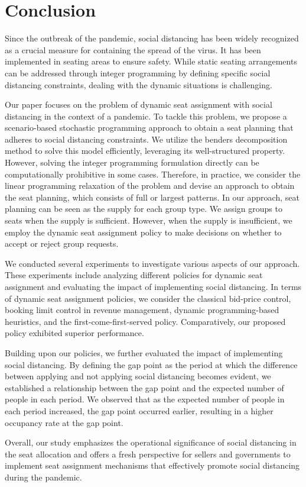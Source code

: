 \section{Conclusion}
Since the outbreak of the pandemic, social distancing has been widely recognized as a crucial measure for containing the spread of the virus. It has been implemented in seating areas to ensure safety. While static seating arrangements can be addressed through integer programming by defining specific social distancing constraints, dealing with the dynamic situations is challenging.


Our paper focuses on the problem of dynamic seat assignment with social distancing in the context of a pandemic. To tackle this problem, we propose a scenario-based stochastic programming approach to obtain a seat planning that adheres to social distancing constraints. We utilize the benders decomposition method to solve this model efficiently, leveraging its well-structured property. However, solving the integer programming formulation directly can be computationally prohibitive in some cases. Therefore, in practice, we consider the linear programming relaxation of the problem and devise an approach to obtain the seat planning, which consists of full or largest patterns. In our approach, seat planning can be seen as the supply for each group type. We assign groups to seats when the supply is sufficient. However, when the supply is insufficient, we employ the dynamic seat assignment policy to make decisions on whether to accept or reject group requests. 


We conducted several experiments to investigate various aspects of our approach. These experiments include analyzing different policies for dynamic seat assignment and evaluating the impact of implementing social distancing. In terms of dynamic seat assignment policies, we consider the classical bid-price control, booking limit control in revenue management, dynamic programming-based heuristics, and the first-come-first-served policy. Comparatively, our proposed policy exhibited superior performance.

Building upon our policies, we further evaluated the impact of implementing social distancing. By defining the gap point as the period at which the difference between applying and not applying social distancing becomes evident, we established a relationship between the gap point and the expected number of people in each period. We observed that as the expected number of people in each period increased, the gap point occurred earlier, resulting in a higher occupancy rate at the gap point.

Overall, our study emphasizes the operational significance of social distancing in the seat allocation and offers a fresh perspective for sellers and governments to implement seat assignment mechanisms that effectively promote social distancing during the pandemic.

